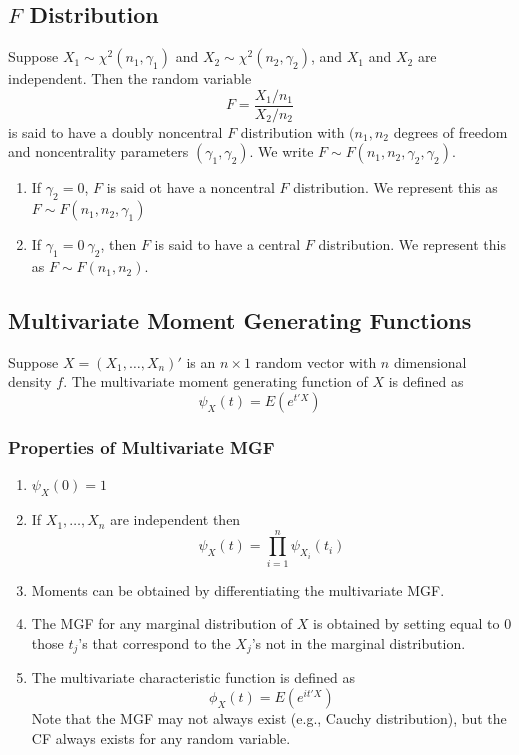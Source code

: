 \documentclass[12pt]{article}
\numberwithin{equation}{section}
\begin{document}
\subsection{$F$ Distribution}
Suppose $X_1 \sim \chi^2(n_1, \gamma_1)$ and $X_2 \sim \chi^2(n_2, \gamma_2)$, and $X_1$ and $X_2$ are independent. Then the random variable
\begin{equation*}
  F = \frac{X_1 / n_1}{X_2 / n_2}
\end{equation*}
is said to have a doubly noncentral $F$ distribution with $(n_1, n_2$ degrees of freedom and noncentrality parameters $(\gamma_1, \gamma_2)$. We write $F \sim F(n_1, n_2, \gamma_2, \gamma_2)$.
\begin{enumerate}
  \item If $\gamma_2 = 0$, $F$ is said ot have a noncentral $F$ distribution. We represent this as $F \sim F(n_1, n_2, \gamma_1)$
  \item If $\gamma_1 = 0 \ \gamma_2$, then $F$ is said to have a central $F$ distribution. We represent this as $F \sim F(n_1, n_2)$.
\end{enumerate}

\subsection{Multivariate Moment Generating Functions}
Suppose $X = (X_1, \ldots, X_n)'$ is an $n \times 1$ random vector with $n$ dimensional density $f$. The multivariate moment generating function of $X$ is defined as
\begin{equation*}
  \psi_X(t) = E(e^{t'X})
\end{equation*}

\subsubsection{Properties of Multivariate MGF}
\begin{enumerate}
  \item $\psi_X(0) = 1$
  \item If $X_1, \ldots, X_n$ are independent then
  \begin{equation*}
    \psi_X(t) = \prod_{i=1}^n \psi_{X_i}(t_i)
  \end{equation*}
  \item Moments can be obtained by differentiating the multivariate MGF.
  \item The MGF for any marginal distribution of $X$ is obtained by setting equal to 0 those $t_j$'s that correspond to the $X_j$'s not in the marginal distribution.
  \item The multivariate characteristic function is defined as
  \begin{equation*}
    \phi_X(t) = E(e^{it'X})
  \end{equation*}
  Note that the MGF may not always exist (e.g., Cauchy distribution), but the CF always exists for any random variable.
\end{enumerate}
\end{document}
